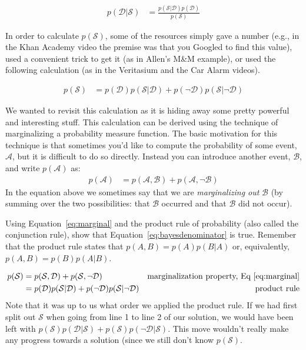 \documentclass[assignment01_Solutions]{subfiles}
\begin{document}
\begin{align}
p(\mathcal{D} | \mathcal{S}) &= \frac{p(\mathcal{S} | \mathcal{D}) p(\mathcal{D})}{p(\mathcal{S})}
\end{align}

In order to calculate $p(\mathcal{S})$, some of the resources simply gave a number (e.g., in the Khan Academy video the premise was that you Googled to find this value), used a convenient trick to get it (as in Allen's M\&M example), or used the following calculation (as in the Veritasium and the Car Alarm videos).

\begin{align}
p(\mathcal{S}) &= p(\mathcal{D}) p(\mathcal{S}|\mathcal{D}) + p(\neg \mathcal{D}) p(\mathcal{S} | \neg \mathcal{D}) \label{eq:bayesdenominator}
\end{align}

We wanted to revisit this calculation as it is hiding away some pretty powerful and interesting stuff.  This calculation can be derived using the technique of marginalizing a probability measure function.  The basic motivation for this technique is that sometimes you'd like to compute the probability of some event, $\mathcal{A}$, but it is difficult to do so directly.  Instead you can introduce another event, $\mathcal{B}$, and write $p(\mathcal{A})$ as:
\begin{align}
p(\mathcal{A}) &= p(\mathcal{A}, \mathcal{B}) + p(\mathcal{A}, \neg \mathcal{B}) \label{eq:marginal}
\end{align}
In the equation above we sometimes say that we are \emph{marginalizing out} $\mathcal{B}$ (by summing over the two possibilities: that $\mathcal{B}$ occurred and that $\mathcal{B}$ did not occur).

\begin{exercise}[(15 minutes)]
Using Equation~\ref{eq:marginal} and the product rule of probability (also called the conjunction rule), show that Equation~\ref{eq:bayesdenominator} is true.  Remember that the product rule states that $p(A,B) = p(A)p(B|A)$ or, equivalently, $p(A,B) = p(B)p(A|B)$.

\begin{boxedsolution}
\begin{align}
p(\mathcal{S}) &= p(\mathcal{S}, \mathcal{D}) + p(\mathcal{S}, \neg \mathcal{D}) & \mbox{marginalization property, Eq~\ref{eq:marginal}} \nonumber \\
&= p(\mathcal{D})p(\mathcal{S}|\mathcal{D}) + p(\neg \mathcal{D}) p(\mathcal{S} | \neg \mathcal{D})& \mbox{product rule} \nonumber
\end{align}
Note that it was up to us what order we applied the product rule.  If we had first split out $\mathcal{S}$ when going from line 1 to line 2 of our solution, we would have been left with $p(\mathcal{S})p(\mathcal{D}|\mathcal{S}) + p(\mathcal{S}) p(\neg \mathcal{D} | \mathcal{S})$.  This move wouldn't really make any progress towards a solution (since we still don't know $p(\mathcal{S})$.

\end{boxedsolution}
\end{exercise}
\end{document}
